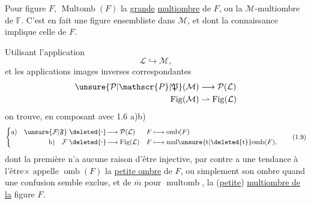 
Pour  figure $F$, $\operatorname{Multomb}(F)$   la \uline{grande} \uline{multiombre} de $F$, ou la $\mathcal{M}$-multiombre de $\mathbb{F}$.  C'est en fait une figure ensembliste dans $\mathcal{M}$, et dont la connaissance implique celle de $F$.

 Utilisant   l'application
\[
\mathcal{L}\hookrightarrow\mathcal{M},
\]
et les applications images inverses correspondantes
\[
\begin{aligned}
\unsure{\mathcal{P}|\mathscr{P}|\mathfrak{P}}(\mathcal{M})&\longrightarrow\mathcal{P}(\mathcal{L})\\
\operatorname{Fig}(\mathcal{M})&\rightharpoonup\operatorname{Fig}(\mathcal{L})
\end{aligned}
\]
on trouve, en composant avec 1.6 a)b)
\[
\left\{\begin{aligned}
\text{a)}\quad \unsure{\mathcal{F}|\mathfrak{F}}&\mathrel{\deleted{\lhook}\!\longrightarrow}\mathcal{P}(\mathcal{L})&
 F&\longmapsto\operatorname{omb}(F)\\
\text{b)}\quad \mathcal{F}&\mathrel{\deleted{\lhook}\!\longrightarrow}\operatorname{Fig}(\mathcal{L})&
 F&\longmapsto\operatorname{mul\unsure{t|\deleted{t}}omb}(F),
\end{aligned}\right.\tag*{(1.9)}
\]
dont la première n'a aucune raison d'être injective,  par contre a une tendance à l'être$\times$   appelle $\operatorname{omb}(F)$ la \uline{petite ombre} de $F$, ou simplement son ombre quand une confusion semble exclue, et de $\overline m$ pour $\operatorname{multomb}$, la (\uline{petite}) \uline{multiombre de la} figure $F$.
